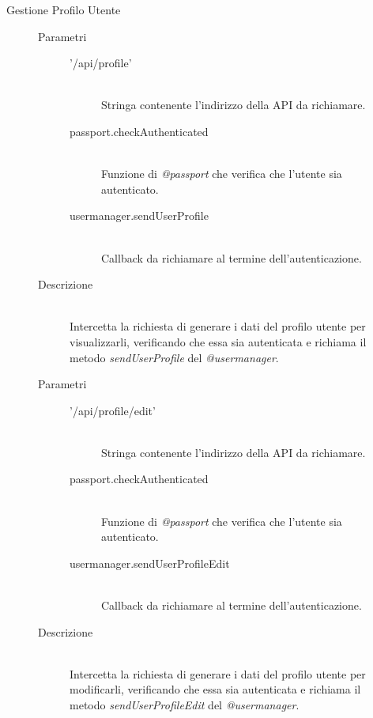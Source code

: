 \begin{description}
\begin{description}
\begin{mldescription}
 \end{mldescription}
 
 \item[Gestione Profilo Utente]
 \begin{mldescription}
   \hfill 
   \begin{description}
    \item[Parametri] \hfill
     \begin{description}
      \item['/api/profile'] \hfill \\
      Stringa contenente l'indirizzo della API da richiamare.
      \item[passport.checkAuthenticated] \hfill \\
      Funzione di \textit{@passport} che verifica che l'utente sia autenticato.
      \item[usermanager.sendUserProfile] \hfill \\
      Callback da richiamare al termine dell'autenticazione.
     \end{description}
    \item[Descrizione] \hfill \\
    Intercetta la richiesta di generare i dati del profilo utente per visualizzarli, verificando che essa sia autenticata e richiama il metodo \textit{sendUserProfile} del \textit{@usermanager}.
    \end{description}
    
    \hfill 
   \begin{description}
    \item[Parametri] \hfill
     \begin{description}
      \item['/api/profile/edit'] \hfill \\
      Stringa contenente l'indirizzo della API da richiamare.
      \item[passport.checkAuthenticated] \hfill \\
      Funzione di \textit{@passport} che verifica che l'utente sia autenticato.
      \item[usermanager.sendUserProfileEdit] \hfill \\
      Callback da richiamare al termine dell'autenticazione.
     \end{description}
    \item[Descrizione] \hfill \\
   Intercetta la richiesta di generare i dati del profilo utente per modificarli, verificando che essa sia autenticata e richiama il metodo \textit{sendUserProfileEdit} del \textit{@usermanager}.
   \end{description} 
   

\end{mldescription}
\end{description}
\end{description}
